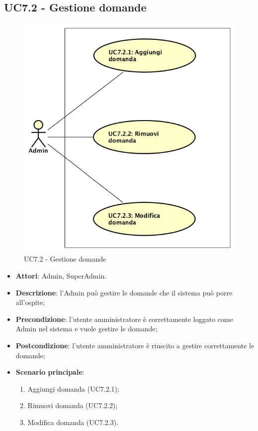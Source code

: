 \documentclass[../AnalisiDeiRequisiti_v3.0.0.tex]{subfiles}
\begin{document}
\subsection{UC7.2 - Gestione domande} 
\label{sssec:UC7.2} 
\begin{figure}[!h]
	\centering
	\includegraphics[width=\textwidth]{UseCases/UC7_GestionePannelloAdmin/UC7_2_GestioneDomande/UC7_2_GestioneDomande.png}
	\caption{UC7.2 - Gestione domande}
\end{figure}
\begin{itemize} 
\item \textbf{Attori}: Admin, SuperAdmin.
\item \textbf{Descrizione}: l'Admin può gestire le domande che il sistema può porre all'ospite;
\item \textbf{Precondizione}: l'utente amministratore è correttamente loggato come Admin nel sistema e vuole gestire le domande;
\item \textbf{Postcondizione}: l'utente amministratore è riuscito a gestire correttamente le domande;
\item \textbf{Scenario principale}: \begin{enumerate}\item Aggiungi domanda (UC7.2.1);\item Rimuovi domanda (UC7.2.2);\item Modifica domanda (UC7.2.3).
\end{enumerate}
\end{itemize} 
\end{document}
